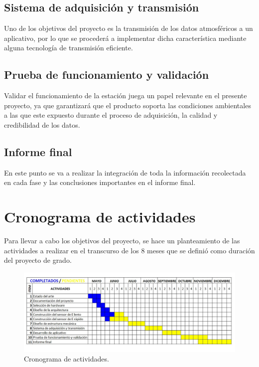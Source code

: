 \documentclass[12pt,a4paper,oneside]{book}
\begin{document}
\section{\textbf{Sistema de adquisición y transmisión
}}
Uno de los objetivos del proyecto es la transmisión de los datos atmosféricos a un aplicativo, por lo que se procederá a implementar dicha característica mediante alguna tecnología de transmisión eficiente.


\section{\textbf{Prueba de funcionamiento y validación
}}
Validar el funcionamiento de la estación juega un papel relevante en el presente proyecto, ya que garantizará que el producto soporta las condiciones ambientales a las que este expuesto durante el proceso de adquisición, la calidad y credibilidad de los datos. 

\section{\textbf{Informe final
}}
En este punto se va a realizar la integración de toda la información recolectada en cada fase y las conclusiones importantes en el informe final. 

 
\newpage 

\chapter{Cronograma de actividades}
Para llevar a cabo los objetivos del proyecto, se hace un planteamiento de las actividades a realizar en el transcurso de los 8 meses que se definió como duración del proyecto de grado.

\begin{figure}[ht]
  \centering
  \includegraphics[width=\columnwidth]{CRONOGRAMA.jpg}
  \caption{Cronograma de actividades.}
\end{figure}
\end{document}
